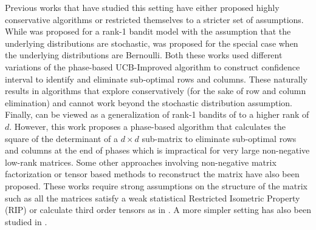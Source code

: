 Previous works that have studied this setting have either proposed highly conservative algorithms or restricted themselves to a stricter set of assumptions. While \citet{katariya2016stochastic} was proposed for a rank-1 bandit model with the assumption that the underlying distributions are stochastic, \citet{katariya2017bernoulli} was proposed for the special case when the underlying distributions are Bernoulli. Both these works used different variations of the phase-based UCB-Improved \citep{auer2010ucb} algorithm to construct confidence interval to identify and eliminate sub-optimal rows and columns. These naturally results in algorithms that explore conservatively (for the sake of row and column elimination) and cannot work beyond the stochastic distribution assumption. Finally, \citet{kveton2017stochastic} can be viewed as a generalization of rank-1 bandits of \citet{katariya2016stochastic} to a higher rank of $d$. However, this work proposes a phase-based algorithm that calculates the square of the determinant of a $d\times d$ sub-matrix to eliminate sub-optimal rows and columns at the end of phases which is impractical for very large non-negative low-rank matrices. Some other approaches involving non-negative matrix factorization \citet{sen2016contextual} or tensor based methods \citep{gopalan2016low} to reconstruct the matrix have also been proposed. These works require strong assumptions on the structure of the matrix such as all the matrices satisfy a weak statistical Restricted Isometric Property (RIP) or calculate third order tensors as in \citep{anandkumar2014tensor}. A more simpler setting has also been studied in \citet{maillard2014latent}.


